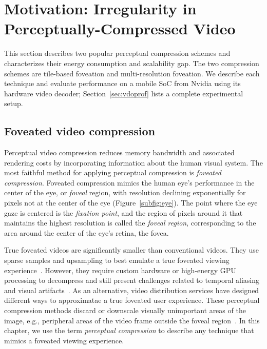 \section{Motivation: Irregularity in Perceptually-Compressed Video}
\label{sec:characterization}

This section describes two popular perceptual compression schemes and characterizes their energy consumption and scalability gap.
The two compression schemes are tile-based foveation and multi-resolution foveation.
We describe each technique and evaluate performance on a mobile SoC from Nvidia using its hardware video decoder; Section~\ref{sec:vdoprof} lists a complete experimental setup.

\perceptualCompressionExampleFigure


\subsection{Foveated video compression}

Perceptual video compression reduces memory bandwidth and associated rendering costs by incorporating information about the human visual system.
The most faithful method for applying perceptual compression is \emph{foveated compression}.
Foveated compression mimics the human eye's performance in the center of the eye, or \emph{foveal} region, with resolution declining exponentially for pixels not at the center of the eye (Figure~\ref{subfig:eye}).
The point where the eye gaze is centered is the \emph{fixation point}, and the region of pixels around it that maintains the highest resolution is called the \emph{foveal region}, corresponding to the area around the center of the eye's retina, the fovea.


True foveated videos are significantly smaller than conventional videos.
They use sparse samples and upsampling to best emulate a true foveated viewing experience~\cite{patney2017perceptual}.
However, they require custom hardware or high-energy GPU processing to decompress and still present challenges related to temporal aliasing and visual artifacts~\cite{kaplanyan2019deepfovea}.
As an alternative, video distribution services have designed different ways to approximatae a true foveated user experience.
These perceptual compression methods discard or downscale visually unimportant areas of the image, e.g., peripheral areas of the video frame outside the foveal region~\cite{google-foveation,fov-cloud-ryoo, visualcloud2017haynes}.
In this chapter, we use the term \emph{perceptual compression} to describe any technique that mimics a foveated viewing experience.


